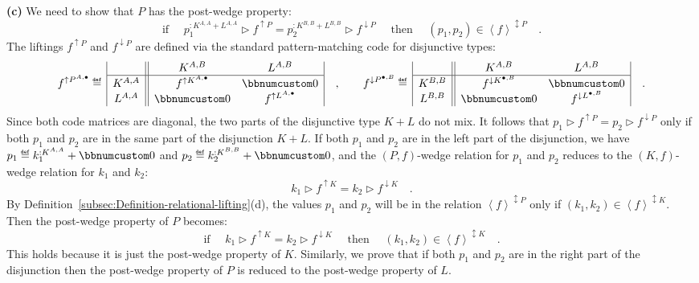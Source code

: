 \textbf{(c)} We need to show that $P$ has the post-wedge property:
\[
\text{if }\quad p_{1}^{:K^{A,A}+L^{A,A}}\triangleright f^{\uparrow P}=p_{2}^{:K^{B,B}+L^{B,B}}\triangleright f^{\downarrow P}\quad\text{ then }\quad(p_{1},p_{2})\in\left<f\right>^{\updownarrow P}\quad.
\]
The liftings $f^{\uparrow P}$ and $f^{\downarrow P}$ are defined
via the standard pattern-matching code for disjunctive types:
\[
f^{\uparrow P^{A,\bullet}}\triangleq\,\begin{array}{|c||cc|}
 & K^{A,B} & L^{A,B}\\
\hline K^{A,A} & f^{\uparrow K^{A,\bullet}} & \bbnum 0\\
L^{A,A} & \bbnum 0 & f^{\uparrow L^{A,\bullet}}
\end{array}\quad,\quad\quad f^{\downarrow P^{\bullet,B}}\triangleq\,\begin{array}{|c||cc|}
 & K^{A,B} & L^{A,B}\\
\hline K^{B,B} & f^{\downarrow K^{\bullet,B}} & \bbnum 0\\
L^{B,B} & \bbnum 0 & f^{\downarrow L^{\bullet,B}}
\end{array}\quad.
\]
Since both code matrices are diagonal, the two parts of the disjunctive
type $K+L$ do not mix. It follows that $p_{1}\triangleright f^{\uparrow P}=p_{2}\triangleright f^{\downarrow P}$
only if both $p_{1}$ and $p_{2}$ are in the same part of the disjunction
$K+L$. If both $p_{1}$ and $p_{2}$ are in the left part of the
disjunction, we have $p_{1}\triangleq k_{1}^{:K^{A,A}}+\bbnum 0$
and $p_{2}\triangleq k_{2}^{:K^{B,B}}+\bbnum 0$, and the $\left(P,f\right)$-wedge
relation for $p_{1}$ and $p_{2}$ reduces to the $\left(K,f\right)$-wedge
relation for $k_{1}$ and $k_{2}$:
\[
k_{1}\triangleright f^{\uparrow K}=k_{2}\triangleright f^{\downarrow K}\quad.
\]
By Definition~\ref{subsec:Definition-relational-lifting}(d), the
values $p_{1}$ and $p_{2}$ will be in the relation $\left<f\right>^{\updownarrow P}$
only if $(k_{1},k_{2})\in\left<f\right>^{\updownarrow K}$. Then the
post-wedge property of $P$ becomes:
\[
\text{if }\quad k_{1}\triangleright f^{\uparrow K}=k_{2}\triangleright f^{\downarrow K}\quad\text{ then }\quad(k_{1},k_{2})\in\left<f\right>^{\updownarrow K}\quad.
\]
This holds because it is just the post-wedge property of $K$. Similarly,
we prove that if both $p_{1}$ and $p_{2}$ are in the right part
of the disjunction then the post-wedge property of $P$ is reduced
to the post-wedge property of $L$.

